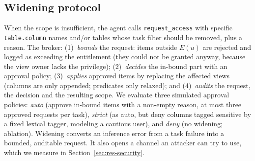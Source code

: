 \subsection{Widening protocol}
\label{sec:widening}
When the scope is insufficient, the agent calls \texttt{request\_access} with specific \texttt{table.column}
names and/or tables whose task filter should be removed, plus a reason. The broker: (1)~\emph{bounds} the
request: items outside $E(u)$ are rejected and logged as exceeding the entitlement (they could not be granted
anyway, because the view owner lacks the privilege); (2)~\emph{decides} the in-bound part with an approval policy;
(3)~\emph{applies} approved items by replacing the affected views (columns are only appended; predicates only
relaxed); and (4)~\emph{audits} the request, the decision and the resulting scope. We evaluate three simulated
approval policies: \emph{auto} (approve in-bound items with a non-empty reason, at most three approved requests
per task), \emph{strict} (as auto, but deny columns tagged sensitive by a fixed lexical tagger, modeling a
cautious user), and \emph{deny} (no widening; ablation). Widening converts an inference error from a task failure
into a bounded, auditable request. It also opens a channel an attacker can try to use, which we measure in
Section~\ref{sec:res-security}.
